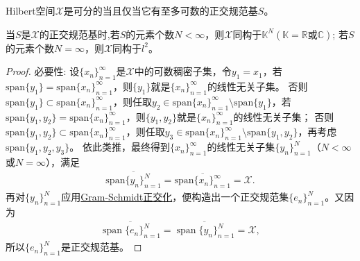 \documentclass[../../main.tex]{subfiles}%
\begin{document}
\begin{theorem}
Hilbert空间$\mathscr{X}$是可分的当且仅当它有至多可数的正交规范基$S$。

当$S$是$\mathscr{X}$的正交规范基时,若$S$的元素个数$N < \infty$，则$\mathscr{X}$同构于$\mathbb{K}^N(\mathbb{K}=\mathbb{R}\text{或}\mathbb{C})$;
若$S$的元素个数$N = \infty$，则$\mathscr{X}$同构于$l^2$。
\end{theorem}
\begin{proof}

{\heiti 必要性:} 设$\{x_n\}_{n=1}^{\infty}$是$\mathscr{X}$中的可数稠密子集，令$y_1=x_1$，若$\mathrm{span}\{ y_1 \} = \mathrm{span}\{ x_n \}_{n=1}^{\infty}$，则$\{ y_1 \}$就是$\{ x_n \}_{n=1}^{\infty}$的线性无关子集。
否则$\mathrm{span}\{ y_1 \} \subset \mathrm{span}\{ x_n \}_{n=1}^{\infty}$，则任取$y_2\in \mathrm{span}\{ x_n \}_{n=1}^{\infty}\setminus \mathrm{span}\{ y_1 \}$，若$\mathrm{span}\{ y_1,y_2 \} = \mathrm{span}\{ x_n \}_{n=1}^{\infty}$，则$\{ y_1,y_2 \}$就是$\{ x_n \}_{n=1}^{\infty}$的线性无关子集；
否则$\mathrm{span}\{ y_1,y_2 \} \subset \mathrm{span}\{ x_n \}_{n=1}^{\infty}$，则任取$y_3\in \mathrm{span}\{ x_n \}_{n=1}^{\infty}\setminus \mathrm{span}\{ y_1,y_2 \}$，再考虑$\mathrm{span}\{ y_1,y_2,y_3 \}$。
依此类推，最终得到$\{ x_n \}_{n=1}^{\infty}$的线性无关子集$\{ y_n \}_{n=1}^{N}$（$N<\infty$或$N=\infty$），满足
\begin{align*}
\overline{\mathrm{span}\{y_n\}_{n=1}^{N}}=\overline{\mathrm{span}\{x_n\}_{n=1}^{\infty}}=\mathscr{X}.
\end{align*}
再对$\{y_n\}_{n=1}^{N}$应用\hyperref[theorem:Gram-Schmidt正交化]{Gram-Schmidt正交化}，便构造出一个正交规范集$\{e_n\}_{n=1}^{N}$。又因为
\begin{align*}
\overline{\operatorname{span}\{e_n\}_{n=1}^{N}} = \overline{\operatorname{span}\{y_n\}_{n=1}^{N}} = \mathscr{X},
\end{align*}
所以$\{e_n\}_{n=1}^{N}$是正交规范基。


\end{proof}
\end{document}
